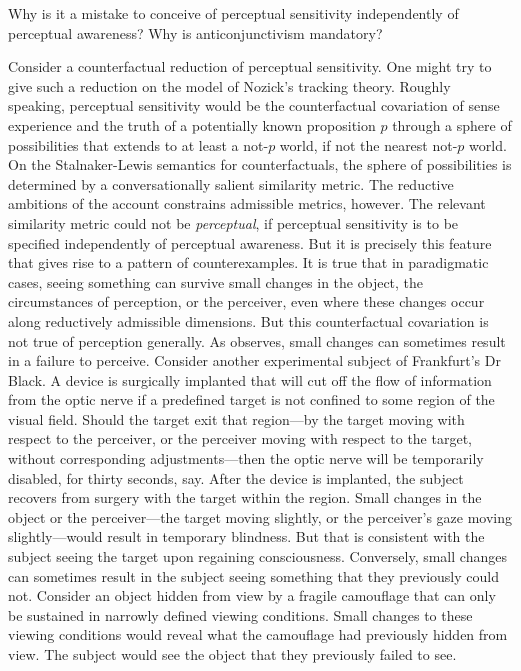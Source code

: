 \documentclass[12pt]{article}
\begin{document}
Why is it a mistake to conceive of perceptual sensitivity independently of perceptual awareness? Why is anticonjunctivism mandatory?

Consider a counterfactual reduction of perceptual sensitivity. One might try to give such a reduction on the model of Nozick's \citeyearpar{Nozick:1981fk} tracking theory. Roughly speaking, perceptual sensitivity would be the counterfactual covariation of sense experience and the truth of a potentially known proposition \( p \) through a sphere of possibilities that extends to at least a not-\( p \) world, if not the nearest not-\( p \) world. On the Stalnaker-Lewis semantics for counterfactuals, the sphere of possibilities is determined by a conversationally salient similarity metric. The reductive ambitions of the account constrains admissible metrics, however. The relevant similarity metric could not be \emph{perceptual}, if perceptual sensitivity is to be specified independently of perceptual awareness. But it is precisely this feature that gives rise to a pattern of counterexamples. It is true that in paradigmatic cases, seeing something can survive small changes in the object, the circumstances of perception, or the perceiver, even where these changes occur along reductively admissible dimensions. But this counterfactual covariation is not true of perception generally.  As \citet{Johnston:2006uq} observes, small changes can sometimes result in a failure to perceive. Consider another experimental subject of Frankfurt's \citeyearpar{Frankfurt:1969kx} Dr Black. A device is surgically implanted that will cut off the flow of information from the optic nerve if a predefined target is not confined to some region of the visual field. Should the target exit that region---by the target moving with respect to the perceiver, or the perceiver moving with respect to the target, without corresponding adjustments---then the optic nerve will be temporarily disabled, for thirty seconds, say. After the device is implanted, the subject recovers from surgery with the target within the region. Small changes in the object or the perceiver---the target moving slightly, or the perceiver's gaze moving slightly---would result in temporary blindness. But that is consistent with the subject seeing the target upon regaining consciousness. Conversely, small changes can sometimes result in the subject seeing something that they previously could not. Consider an object hidden from view by a fragile camouflage that can only be sustained in narrowly defined viewing conditions. Small changes to these viewing conditions would reveal what the camouflage had previously hidden from view. The subject would see the object that they previously failed to see.
\end{document}
